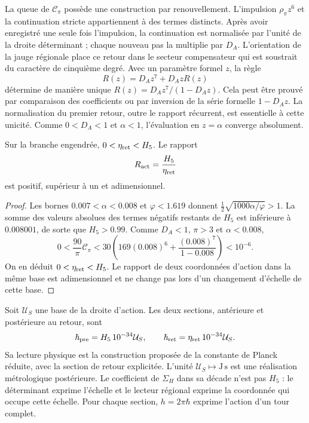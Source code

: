 La queue de \(\mathcal C_\pi\) possède une construction par renouvellement.
L’impulsion \(\rho_\pi z^6\) et la continuation stricte appartiennent
à des termes distincts. Après avoir enregistré une seule fois l’impulsion,
la continuation est normalisée par l’unité de la droite déterminant ;
chaque nouveau pas la multiplie par \(D_A\). L’orientation de la
jauge régionale place ce retour dans le secteur compensateur qui
est soustrait du caractère de cinquième degré.
Avec un paramètre formel \(z\), la règle
\begin{equation}
 R(z)=D_Az^7+D_AzR(z)
 \label{vi:dep:renovacion}
\end{equation}
détermine de manière unique
\(R(z)=D_Az^7/(1-D_Az)\). Cela peut être prouvé par comparaison des
coefficients ou par inversion de la série formelle \(1-D_Az\).
La normalisation du premier retour, outre le rapport récurrent,
est essentielle à cette unicité. Comme \(0<D_A<1\) et \(\alpha<1\),
l’évaluation en \(z=\alpha\) converge absolument.

\begin{proposition}
\label{vi:dep:positividad-accion}
Sur la branche engendrée, \(0<\eta_{\rm ret}<H_5\). Le rapport
\begin{equation}
 R_{\rm act}=\frac{H_5}{\eta_{\rm ret}}
 \label{vi:dep:Ract}
\end{equation}
est positif, supérieur à un et adimensionnel.
\end{proposition}
\begin{proof}
Les bornes \(0.007<\alpha<0.008\) et \(\varphi<1.619\) donnent
\(\tfrac12\sqrt{1000\alpha/\varphi}>1\). La somme des valeurs absolues
des termes négatifs restants de \(H_5\) est inférieure à
\(0.008001\), de sorte que \(H_5>0.99\).
Comme \(D_A<1\), \(\pi>3\) et \(\alpha<0.008\),
\[
 0<\frac{90}{\pi}\mathcal C_\pi
 <30\left(169(0.008)^6+
                  \frac{(0.008)^7}{1-0.008}\right)<10^{-6}.
\]
On en déduit \(0<\eta_{\rm ret}<H_5\). Le rapport de deux coordonnées
d’action dans la même base est adimensionnel et ne change pas lors d’un changement d’échelle
de cette base.
\end{proof}

Soit \(\mathcal U_S\) une base de la droite d’action. Les deux
sections, antérieure et postérieure au retour, sont
\begin{equation}
 \hbar_{\rm pre}=H_5\,10^{-34}\mathcal U_S,
 \qquad
 \hbar_{\rm ret}=\eta_{\rm ret}\,10^{-34}\mathcal U_S.
 \label{vi:dep:hbar}
\end{equation}
Sa lecture physique est la construction proposée de la constante de Planck
réduite, avec la section de retour explicitée. L’unité
\(\mathcal U_S\mapsto\mathrm{J\,s}\) est une réalisation métrologique
postérieure. Le coefficient de \(\Sigma_H\) dans sa décade n’est pas
\(H_5\) : le déterminant exprime l’échelle et le lecteur régional
exprime la coordonnée qui occupe cette échelle. Pour chaque section,
\(h=2\pi\hbar\) exprime l’action d’un tour complet.

